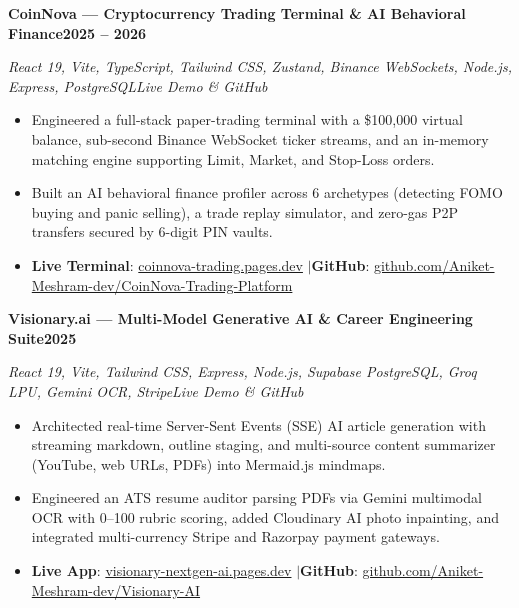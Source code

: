\documentclass[letterpaper,10pt]{article}
\newcommand{\resumeItemListStart}{\begin{itemize}[leftmargin=0.18in, topsep=1.5pt, itemsep=2.0pt, parsep=0pt]}
\newcommand{\resumeItemListEnd}{\end{itemize}\vspace{3pt}}
\newcommand{\resumeHeading}[2]{%
  \noindent\textbf{#1}\hfill\textbf{#2}\par
}
\newcommand{\resumeSubHeading}[2]{%
  \noindent\textit{#1}\hfill\textit{#2}\par
}
\newcommand{\sep}{\hspace{3pt}$|$\hspace{3pt}}
\begin{document}
\resumeHeading{CoinNova --- Cryptocurrency Trading Terminal \& AI Behavioral Finance}{2025 -- 2026}
\resumeSubHeading{React 19, Vite, TypeScript, Tailwind CSS, Zustand, Binance WebSockets, Node.js, Express, PostgreSQL}{Live Demo \& GitHub}
\resumeItemListStart
  \item Engineered a full-stack paper-trading terminal with a \$100,000 virtual balance, sub-second Binance WebSocket ticker streams, and an in-memory matching engine supporting Limit, Market, and Stop-Loss orders.
  \item Built an AI behavioral finance profiler across 6 archetypes (detecting FOMO buying and panic selling), a trade replay simulator, and zero-gas P2P transfers secured by 6-digit PIN vaults.
  \item \textbf{Live Terminal}: \href{https://coinnova-trading.pages.dev/}{\faExternalLinkAlt\hspace{2pt}coinnova-trading.pages.dev} \sep \textbf{GitHub}: \href{https://github.com/Aniket-Meshram-dev/CoinNova-Trading-Platform}{\faGithub\hspace{2pt}github.com/Aniket-Meshram-dev/CoinNova-Trading-Platform}
\resumeItemListEnd
\vspace{2pt}

\resumeHeading{Visionary.ai --- Multi-Model Generative AI \& Career Engineering Suite}{2025}
\resumeSubHeading{React 19, Vite, Tailwind CSS, Express, Node.js, Supabase PostgreSQL, Groq LPU, Gemini OCR, Stripe}{Live Demo \& GitHub}
\resumeItemListStart
  \item Architected real-time Server-Sent Events (SSE) AI article generation with streaming markdown, outline staging, and multi-source content summarizer (YouTube, web URLs, PDFs) into Mermaid.js mindmaps.
  \item Engineered an ATS resume auditor parsing PDFs via Gemini multimodal OCR with 0--100 rubric scoring, added Cloudinary AI photo inpainting, and integrated multi-currency Stripe and Razorpay payment gateways.
  \item \textbf{Live App}: \href{https://visionary-nextgen-ai.pages.dev/}{\faExternalLinkAlt\hspace{2pt}visionary-nextgen-ai.pages.dev} \sep \textbf{GitHub}: \href{https://github.com/Aniket-Meshram-dev/Visionary-AI}{\faGithub\hspace{2pt}github.com/Aniket-Meshram-dev/Visionary-AI}
\resumeItemListEnd

\end{document}
